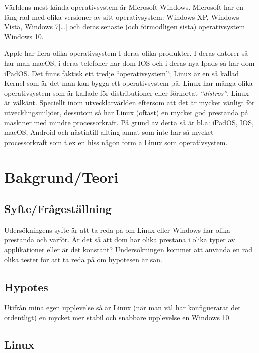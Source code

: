 \documentclass[12pt, a4paper]{report}
\begin{document}
   Världens mest kända operativsystem\cite{winstat} är Microsoft Windows. Microsoft har en lång rad med olika versioner av sitt operativsystem\cite{windows}: Windows XP, Windows Vista, Windows 7[\dots] och deras senaste (och förmodligen sista) operativsystem Windows 10.
    
   Apple har flera olika operativsystem\cite{appleOS} I deras olika produkter. I deras datorer så har man macOS, i deras telefoner har dom IOS och i deras nya Ipads så har dom iPadOS.
    Det finns faktisk ett tredje ``operativsystem''; Linux är en så kallad Kernel \cite{redhat} som är det man kan bygga ett operativsystem på. Linux har många olika operativsystem som är kallade för distributioner eller förkortat \textit{``distros''}. Linux är välkänt. Speciellt inom utvecklarvärlden eftersom att det är mycket vänligt för utvecklingsmiljöer, dessutom så har Linux (oftast) en mycket god prestanda på maskiner med mindre processorkraft\cite{whatislinux}. På grund av detta så är bl.a: iPadOS, IOS, macOS, Android och nästintill allting annat som inte har så mycket processorkraft som t.ex en hiss någon form a Linux som operativsystem.
    
    \section{Bakgrund/Teori}


    \subsection{Syfte/Frågeställning}
    Udersökningens syfte är att ta reda på om Linux eller Windows har olika prestanda och varför. Är det så att dom har olika prestana i olika typer av applikationer eller är det konstant? Undersökningen kommer att använda en rad olika tester för att ta reda på om hypotesen är san.
 

    \subsection{Hypotes}

    Utifrån mina egen upplevelse så är Linux (när man väl har konfiguerarat det ordentligt) en mycket mer stabil och snabbare upplevelse en Windows 10.
 

    \subsection{Linux}
 
\end{document}
